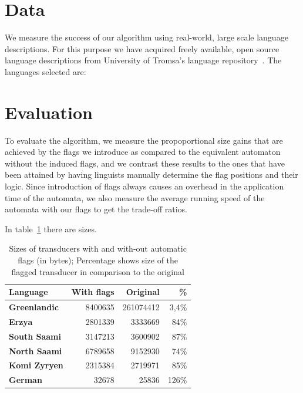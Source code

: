 \documentclass[11pt]{article}
\begin{document}
\section{Data}
\label{sec:data}

We measure the success of our algorithm using real-world, large scale language
descriptions. For this purpose we have acquired freely available, open source
language descriptions from University of Tromsa's language 
repository~\cite{moshagen2013building}. The languages selected are:

\section{Evaluation}
\label{sec:evaluation}

To evaluate the algorithm, we measure the propoportional size gains that are
achieved by the flags we introduce as compared to the equivalent automaton
without the induced flags, and we contrast these results to the ones that have
been attained by having linguists manually determine the flag positions and
their logic. Since introduction of flags always causes an overhead in the
application time of the automata, we also measure the average running speed
of the automata with our flags to get the trade-off ratios.

In table~\ref{table:sizes} there are sizes.

\begin{table}
    \centering
    \begin{tabular}{|l|r|r|r|}
        \hline
        \bf Language & \bf With flags & \bf Original & \bf \% \\
        \hline
        \bf Greenlandic & 8400635 & 261074412 & 3,4\%  \\
        \bf Erzya & 2801339 & 3333669 & 84\%  \\
        \bf South Saami & 3147213 & 3600902 & 87\%  \\
        \bf North Saami & 6789658 & 9152930 & 74\%  \\
        \bf Komi Zyryen & 2315384 & 2719971 & 85\%  \\
        \bf German & 32678 & 25836 & 126\%  \\
        \hline
    \end{tabular}
    \caption{Sizes of transducers with and with-out automatic flags (in bytes); Percentage shows size of the flagged transducer in comparison to the original
    \label{table:sizes}}
\end{table}
\end{document}
